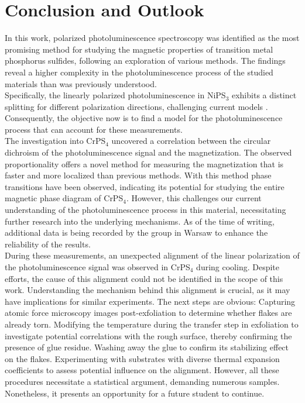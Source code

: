 \documentclass[
	oneside,
	parskip=half,
	a4paper,
]{scrbook}
\begin{document}
\chapter{Conclusion and Outlook}
In this work, polarized photoluminescence spectroscopy was identified as the most promising method for studying the magnetic properties of transition metal phosphorus sulfides, following an exploration of various methods.
The findings reveal a higher complexity in the photoluminescence process of the studied materials than was previously understood.\\
Specifically, the linearly polarized photoluminescence in NiPS$_3$ exhibits a distinct splitting for different polarization directions, challenging current models \cite{NiPS3_magnon_gap,NiPS3_linear,NiPS3_coherent}.
Consequently, the objective now is to find a model for the photoluminescence process that can account for these measurements.\\
The investigation into CrPS$_4$ uncovered a correlation between the circular dichroism of the photoluminescence signal and the magnetization.
The observed proportionality offers a novel method for measuring the magnetization that is faster and more localized than previous methods.
With this method phase transitions have been observed, indicating its potential for studying the entire magnetic phase diagram of CrPS$_4$.
However, this challenges our current understanding of the photoluminescence process in this material, necessitating further research into the underlying mechanisms.
As of the time of writing, additional data is being recorded by the group in Warsaw to enhance the reliability of the results.\\
During these measurements, an unexpected alignment of the linear polarization of the photoluminescence signal was observed in CrPS$_4$ during cooling.
Despite efforts, the cause of this alignment could not be identified in the scope of this work.
Understanding the mechanism behind this alignment is crucial, as it may have implications for similar experiments.
The next steps are obvious:
Capturing atomic force microscopy images post-exfoliation to determine whether flakes are already torn.
Modifying the temperature during the transfer step in exfoliation to investigate potential correlations with the rough surface, thereby confirming the presence of glue residue.
Washing away the glue to confirm its stabilizing effect on the flakes.
Experimenting with substrates with diverse thermal expansion coefficients to assess potential influence on the alignment.
However, all these procedures necessitate a statistical argument, demanding numerous samples. 
Nonetheless, it presents an opportunity for a future student to continue.
\end{document}
